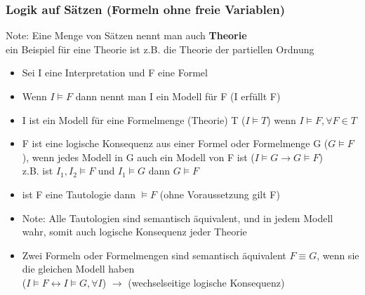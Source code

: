 \documentclass[12pt,a4paper]{article}
\begin{document}
\subsubsection{Logik auf Sätzen (Formeln ohne freie Variablen)}
Note: Eine Menge von Sätzen nennt man auch \textbf{Theorie}\\
ein Beispiel für eine Theorie ist z.B. die Theorie der partiellen Ordnung\\
\begin{itemize}
\item Sei I eine Interpretation und F eine Formel
\item Wenn $I \models F$ dann nennt man I ein Modell für F (I erfüllt F)
\item I ist ein Modell für eine Formelmenge (Theorie) T ($I \models T$) wenn $I \models F, \forall F\in T$
\item F ist eine logische Konsequenz aus einer Formel oder Formelmenge G ($G \models F$), wenn jedes Modell in G auch ein Modell von F ist ($I \models G \rightarrow G \models F$)\\ z.B. ist $I_1, I_2 \models F$ und $I_1 \models G$ dann $G \models F$
\item ist F eine Tautologie dann $\models F$ (ohne Voraussetzung gilt F)
\item Note: Alle Tautologien sind semantisch äquivalent, und in jedem Modell wahr, somit auch logische Konsequenz jeder Theorie
\item Zwei Formeln oder Formelmengen sind semantisch äquivalent $F \equiv G$, wenn sie die gleichen Modell haben\\
($I \models F \leftrightarrow I \models G, \forall I$) $\rightarrow$ (wechselseitige logische Konsequenz)
\end{itemize}
\end{document}
